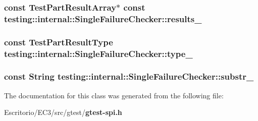 \subsubsection{\setlength{\rightskip}{0pt plus 5cm}const {\bf TestPartResultArray}$\ast$ const {\bf testing::internal::SingleFailureChecker::results\_\-}\hspace{0.3cm}{\tt  [private]}}\label{classtesting_1_1internal_1_1SingleFailureChecker_33031b09d43a503d2f8cdafdec9165b7}


\subsubsection{\setlength{\rightskip}{0pt plus 5cm}const {\bf TestPartResultType} {\bf testing::internal::SingleFailureChecker::type\_\-}\hspace{0.3cm}{\tt  [private]}}\label{classtesting_1_1internal_1_1SingleFailureChecker_165c6f90fa61e8153ea943880587bc57}


\subsubsection{\setlength{\rightskip}{0pt plus 5cm}const {\bf String} {\bf testing::internal::SingleFailureChecker::substr\_\-}\hspace{0.3cm}{\tt  [private]}}\label{classtesting_1_1internal_1_1SingleFailureChecker_ab11e92b0c1dc5f6d829220eb10702d4}




The documentation for this class was generated from the following file:\begin{CompactItemize}
\item 
Escritorio/EC3/src/gtest/{\bf gtest-spi.h}\end{CompactItemize}
